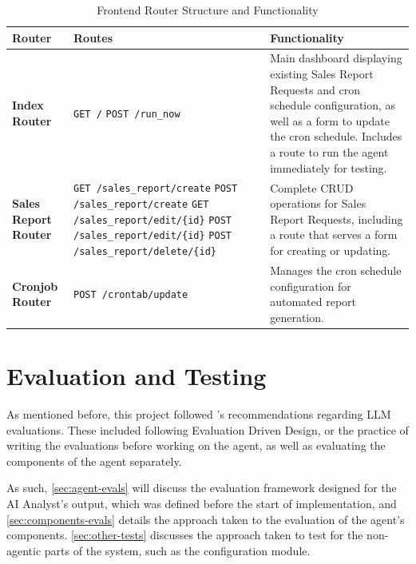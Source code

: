 \documentclass[a4paper]{report}
\begin{document}
\begin{table}[H]
\centering
\begin{tabular}{|p{2.5cm}|p{5.5cm}|p{6.5cm}|}
\hline
\textbf{Router} & \textbf{Routes} & \textbf{Functionality} \\ \hline
\textbf{Index Router} & 
\texttt{GET /} \newline \texttt{POST /run\_now} & 
Main dashboard displaying existing Sales Report Requests and cron schedule configuration, as well as a form to update the cron schedule. Includes a route to run the agent immediately for testing. \\ \hline
\textbf{Sales Report Router} & 
\texttt{GET /sales\_report/create} \newline \texttt{POST /sales\_report/create} \newline \texttt{GET /sales\_report/edit/\{id\}} \newline \texttt{POST /sales\_report/edit/\{id\}} \newline \texttt{POST /sales\_report/delete/\{id\}} & 
Complete CRUD operations for Sales Report Requests, including a route that serves a form for creating or updating. \\ \hline

\textbf{Cronjob Router} & 
\texttt{POST /crontab/update} & 
Manages the cron schedule configuration for automated report generation. \\ \hline
\end{tabular}
\caption{Frontend Router Structure and Functionality}
\label{tab:frontend-routes}
\end{table}

\chapter{Evaluation and Testing}
\label{chapter:evaluation-testing}

As mentioned before, this project followed \cite{aiebook2025}'s recommendations regarding LLM evaluations. These included following Evaluation Driven Design, or the practice of writing the evaluations before working on the agent, as well as evaluating the components of the agent separately.

As such, \autoref{sec:agent-evals} will discuss the evaluation framework designed for the AI Analyst's output, which was defined before the start of implementation, and \autoref{sec:components-evals} details the approach taken to the evaluation of the agent's components. \autoref{sec:other-tests} discusses the approach taken to test for the non-agentic parts of the system, such as the configuration module.
\end{document}
